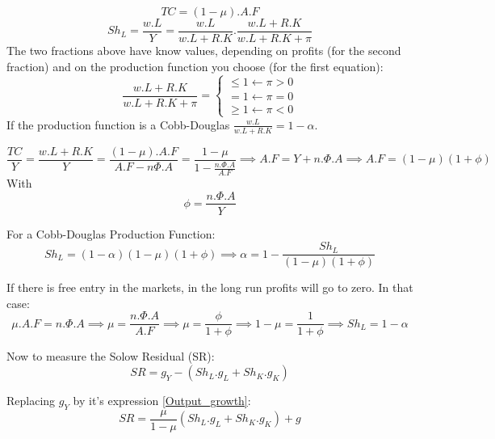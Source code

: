 \begin{equation*}
    TC=(1-\mu).A.F
\end{equation*}
\begin{equation*}
    Sh_{L}=\frac{w.L}{Y}=\frac{w.L}{w.L+R.K}.\frac{w.L+R.K}{w.L+R.K+\pi}
\end{equation*}
The two fractions above have know values, depending on profits (for the second fraction) and on the production function you choose (for the first equation):
\[
\frac{w.L+R.K}{w.L+R.K+\pi}= \left\{
    \begin{array}{l}
         {\leq 1}  \longleftarrow \pi > 0 \\
         {= 1}   \longleftarrow \pi=0\\ 
         {\geq 1}  \longleftarrow \pi<0
    \end{array}
\right.
\]
If the production function is a Cobb-Douglas $\frac{w.L}{w.L+R.K}=1-\alpha$.

\begin{equation*}
    \frac{TC}{Y}=\frac{w.L+R.K}{Y}=\frac{(1-\mu).A.F}{A.F-n\Phi.A}=\frac{1-\mu}{1-\frac{n.\Phi.A}{A.F}} \implies A.F=Y+n.\Phi.A \implies A.F=(1-\mu)(1+\phi)
\end{equation*}
With 
\begin{equation*}
    \phi=\frac{n.\Phi.A}{Y}
\end{equation*}

For a Cobb-Douglas Production Function: 
\begin{equation*}
    Sh_{L}=(1-\alpha)(1-\mu)(1+\phi) \implies \alpha=1-\frac{Sh_{L}}{(1-\mu)(1+\phi)}
\end{equation*}

If there is free entry in the markets, in the long run profits will go to zero. In that case: 
\begin{equation*}
    \mu.A.F=n.\Phi.A \implies \mu=\frac{n.\Phi.A}{A.F} \implies \mu=\frac{\phi}{1+\phi} \implies 1-\mu=\frac{1}{1+\phi} \implies Sh_{L}=1-\alpha
\end{equation*}

Now to measure the Solow Residual (SR): 
\begin{equation*}
    SR=g_{Y}-(Sh_{L}.g_{L}+Sh_{K}.g_{K})
\end{equation*}

Replacing $g_{Y}$ by it's expression \ref{Output_growth}:
\begin{equation*}
    SR=\frac{\mu}{1-\mu}(Sh_{L}.g_{L}+Sh_{K}.g_{K})+g
\end{equation*}

